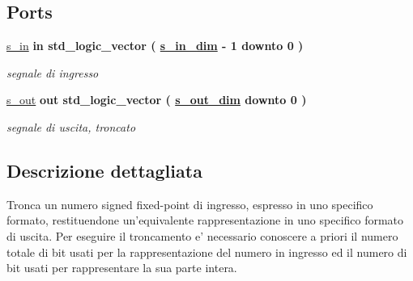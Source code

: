 \subsection*{Ports}
 \begin{DoxyCompactItemize}
\item 
\hyperlink{classtruncate_a6d6bd3ddfff26c223f1752f25545e304}{s\+\_\+in}  {\bfseries {\bfseries \textcolor{vhdlchar}{in}\textcolor{vhdlchar}{ }}} {\bfseries \textcolor{vhdlchar}{std\+\_\+logic\+\_\+vector}\textcolor{vhdlchar}{ }\textcolor{vhdlchar}{(}\textcolor{vhdlchar}{ }\textcolor{vhdlchar}{ }\textcolor{vhdlchar}{ }\textcolor{vhdlchar}{ }{\bfseries \hyperlink{classtruncate_ad3d18243ad6fe53a2277e2aa9b94ca45}{s\+\_\+in\+\_\+dim}} \textcolor{vhdlchar}{-\/}\textcolor{vhdlchar}{ } \textcolor{vhdldigit}{1} \textcolor{vhdlchar}{ }\textcolor{vhdlchar}{downto}\textcolor{vhdlchar}{ }\textcolor{vhdlchar}{ } \textcolor{vhdldigit}{0} \textcolor{vhdlchar}{ }\textcolor{vhdlchar}{)}\textcolor{vhdlchar}{ }} 
\begin{DoxyCompactList}\small\item\em segnale di ingresso \end{DoxyCompactList}\item 
\hyperlink{classtruncate_a7c0b5e84820296cfa624ce710d19debd}{s\+\_\+out}  {\bfseries {\bfseries \textcolor{vhdlchar}{out}\textcolor{vhdlchar}{ }}} {\bfseries \textcolor{vhdlchar}{std\+\_\+logic\+\_\+vector}\textcolor{vhdlchar}{ }\textcolor{vhdlchar}{(}\textcolor{vhdlchar}{ }\textcolor{vhdlchar}{ }\textcolor{vhdlchar}{ }\textcolor{vhdlchar}{ }{\bfseries \hyperlink{classtruncate_a8b62f8bfecb0fab845995b8b051101bc}{s\+\_\+out\+\_\+dim}} \textcolor{vhdlchar}{ }\textcolor{vhdlchar}{downto}\textcolor{vhdlchar}{ }\textcolor{vhdlchar}{ } \textcolor{vhdldigit}{0} \textcolor{vhdlchar}{ }\textcolor{vhdlchar}{)}\textcolor{vhdlchar}{ }} 
\begin{DoxyCompactList}\small\item\em segnale di uscita, troncato \end{DoxyCompactList}\end{DoxyCompactItemize}


\subsection{Descrizione dettagliata}
Tronca un numero signed fixed-\/point di ingresso, espresso in uno specifico formato, restituendone un'equivalente rappresentazione in uno specifico formato di uscita. Per eseguire il troncamento e' necessario conoscere a priori il numero totale di bit usati per la rappresentazione del numero in ingresso ed il numero di bit usati per rappresentare la sua parte intera. 

